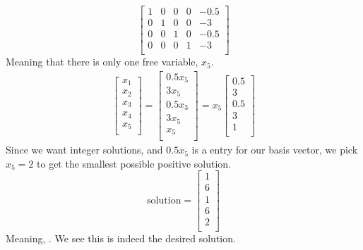 \documentclass{article}
\begin{document}
\begin{equation*}
\begin{bmatrix}
1 &	0	&0&	0	&-0.5 \\ 
0 &	1	&0&	0	&-3 \\
0 &	0	&1&	0	&-0.5 \\
0&	0	&0&	1	&-3 \\

\end{bmatrix} 
\end{equation*}
Meaning that there is only one free variable, $x_5$.
\begin{equation*}
\begin{split}
\begin{bmatrix}
x_1 \\
x_2 \\
x_3 \\
x_4 \\
x_5 \\
\end{bmatrix} = 
\begin{bmatrix}
0.5x_5 \\ 
3x_5 \\
0.5x_3 \\ 
3x_5 \\
x_5 \\
\end{bmatrix} = 
x_5
\begin{bmatrix}
0.5 \\ 
3 \\
0.5 \\ 
3 \\
1\\
\end{bmatrix}
\end{split}
\end{equation*}
Since we want integer solutions, and $0.5x_5$ is a entry for our basis vector, we pick $x_5 = 2$ to get the smallest possible positive solution. 
$$ \mathrm{solution} = 
\begin{bmatrix}
1 \\
6 \\
1 \\
6 \\
2 \\
\end{bmatrix}
$$
Meaning, . We see this is indeed the desired solution.
\end{document}
